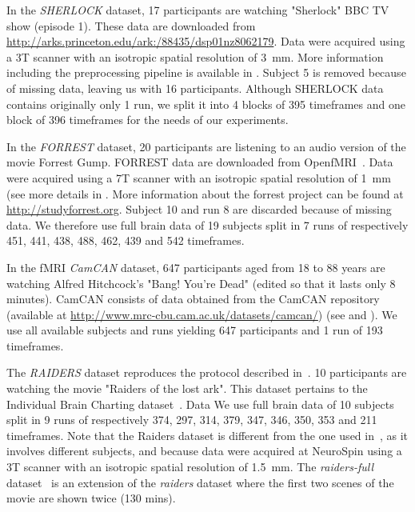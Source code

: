 In the \emph{SHERLOCK} dataset, 17 participants are watching "Sherlock" BBC TV show (episode 1). 
% 
These data are downloaded from \url{http://arks.princeton.edu/ark:/88435/dsp01nz8062179}. 
% 
Data were acquired using a 3T scanner with an isotropic spatial resolution of 3~mm. 
% 
More information including the preprocessing pipeline is available in \cite{sherlock}.
% 
Subject 5 is removed because of missing data, leaving us with 16 participants.
% 
Although SHERLOCK data contains originally only 1 run, we split it into 4 blocks of 395 timeframes and one block of 396 timeframes for the needs of our experiments. 

In the \emph{FORREST} dataset, 20 participants are listening to an audio version of the movie Forrest Gump.
% 
FORREST data are downloaded from OpenfMRI~\cite{poldrack2013toward}. 
% 
Data were acquired using a 7T scanner with an isotropic spatial resolution of 1 mm (see more details in \cite{hanke2014high}.
% 
More information about the forrest project can be found at \url{http://studyforrest.org}.
% 
Subject 10 and run 8 are discarded because of missing data.
% 
We therefore use full brain data of 19 subjects split in 7 runs of respectively 451, 441, 438, 488, 462, 439 and 542 timeframes.


In the fMRI \emph{CamCAN} dataset, 647 participants aged from 18 to 88 years are watching Alfred Hitchcock's "Bang! You're Dead" (edited so that it lasts only 8 minutes).
% 
CamCAN consists of data obtained from the CamCAN repository (available at \url{http://www.mrc-cbu.cam.ac.uk/datasets/camcan/}) (see \cite{taylor2017cambridge} and \cite{shafto2014cambridge}).
% 
We use all available subjects and runs yielding 647 participants and 1 run of 193 timeframes.


The \emph{RAIDERS} dataset reproduces the protocol described
in~\cite{haxby2011common}. 10 participants are watching the movie "Raiders
of the lost ark". This dataset pertains to the Individual Brain Charting
dataset~\cite{ibc, ibc2}.
% 
Data 
% 
We use full brain data of 10 subjects split in 9 runs of respectively 374, 297, 314, 379, 347, 346, 350, 353 and 211 timeframes.
%
Note that the Raiders dataset is different from the one used in~\cite{chen2015reduced}, as it involves different subjects, and because data were acquired at NeuroSpin using a 3T scanner with an isotropic spatial resolution of 1.5 mm.
The \emph{raiders-full} dataset~\cite{ibc, ibc2} is an extension of the \emph{raiders} dataset where the first two scenes of the movie are shown twice (130 mins).

